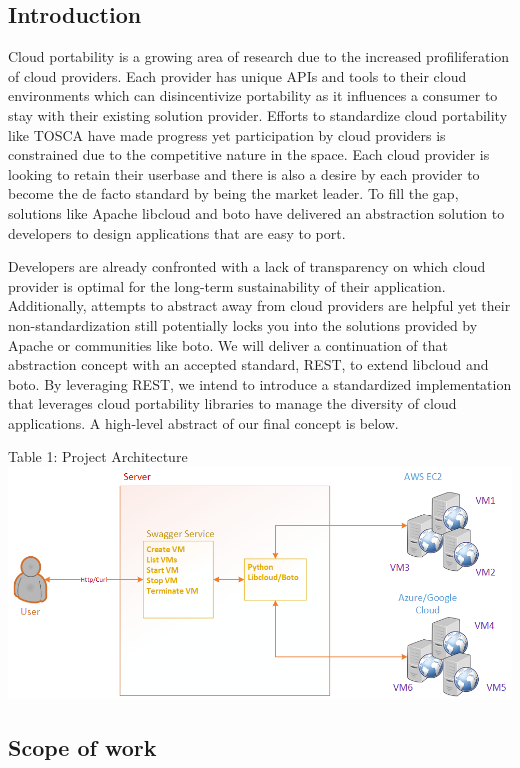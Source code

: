 \subsection{Introduction}\label{introduction}

Cloud portability is a growing area of research due to the increased
profiliferation of cloud providers. Each provider has unique APIs and
tools to their cloud environments which can disincentivize portability
as it influences a consumer to stay with their existing solution
provider. Efforts to standardize cloud portability like TOSCA have made
progress yet participation by cloud providers is constrained due to the
competitive nature in the space. Each cloud provider is looking to
retain their userbase and there is also a desire by each provider to
become the de facto standard by being the market leader. To fill the
gap, solutions like Apache libcloud and boto have delivered an
abstraction solution to developers to design applications that are easy
to port.

Developers are already confronted with a lack of transparency on which
cloud provider is optimal for the long-term sustainability of their
application. Additionally, attempts to abstract away from cloud
providers are helpful yet their non-standardization still potentially
locks you into the solutions provided by Apache or communities like
boto. We will deliver a continuation of that abstraction concept with an
accepted standard, REST, to extend libcloud and boto. By leveraging
REST, we intend to introduce a standardized implementation that
leverages cloud portability libraries to manage the diversity of cloud
applications. A high-level abstract of our final concept is below.

Table 1: Project Architecture \includegraphics{images/proj-arch.png}

\subsection{Scope of work}\label{scope-of-work}

